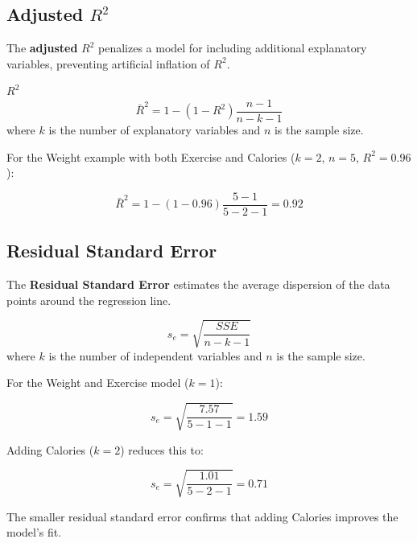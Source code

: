 \documentclass[
  11pt,
  letterpaper,
  DIV=11,
  numbers=noendperiod,
  oneside,
  open=any]{scrreprt}
\begin{document}
\subsection*{\texorpdfstring{Adjusted
\(R^2\)}{Adjusted R\^{}2}}\label{adjusted-r2}

The \textbf{adjusted} \(R^2\) penalizes a model for including additional
explanatory variables, preventing artificial inflation of \(R^2\).

\begin{bsformula}

\(R^2\) \[\bar{R}^2=1-(1-R^2)\frac{n-1}{n-k-1}\] where \(k\) is the
number of explanatory variables and \(n\) is the sample size.

\end{bsformula}

\begin{bsexample}[Example]

For the Weight example with both Exercise and Calories (\(k=2\),
\(n=5\), \(R^2=0.96\)):

\[\bar{R}^2=1-(1-0.96)\frac{5-1}{5-2-1}=0.92\]

\end{bsexample}

\subsection*{Residual Standard Error}\label{residual-standard-error}

The \textbf{Residual Standard Error} estimates the average dispersion of
the data points around the regression line.

\begin{bsformula}

\[s_e=\sqrt{\frac{SSE}{n-k-1}}\] where \(k\) is the number of
independent variables and \(n\) is the sample size.

\end{bsformula}

\begin{bsexample}[Example]

For the Weight and Exercise model (\(k=1\)):

\[s_e=\sqrt{\frac{7.57}{5-1-1}}=1.59\]

Adding Calories (\(k=2\)) reduces this to:

\[s_e=\sqrt{\frac{1.01}{5-2-1}}=0.71\]

The smaller residual standard error confirms that adding Calories
improves the model's fit.

\end{bsexample}
\end{document}
